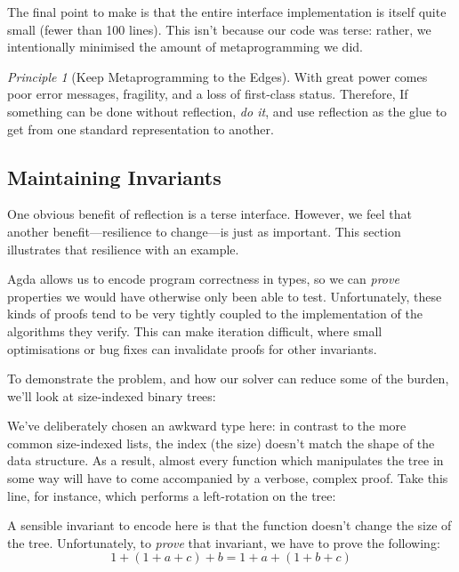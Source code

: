 \documentclass[acmsmall,anonymous]{acmart}\settopmatter{printfolios=true,printccs=false,printacmref=false}
\theoremstyle{remark}
\newtheorem{principle}{Principle}
\begin{document}
The final point to make is that the entire interface implementation is itself
quite small (fewer than 100 lines). This isn't because our code was terse:
rather, we intentionally minimised the amount of metaprogramming we did.

\begin{principle}[Keep Metaprogramming to the Edges] With great power comes poor
  error messages, fragility, and a loss of first-class status. Therefore, If
  something can be done without reflection, \emph{do it}, and use reflection as
  the glue to get from one standard representation to another.
\end{principle}
\subsection{Maintaining Invariants}
One obvious benefit of reflection is a terse interface. However, we feel that
another benefit---resilience to change---is just as important. This section
illustrates that resilience with an example.

Agda allows us to encode program correctness in types, so we can \emph{prove}
properties we would have otherwise only been able to test. Unfortunately, these
kinds of proofs tend to be very tightly coupled to the implementation of the
algorithms they verify. This can make iteration difficult, where small
optimisations or bug fixes can invalidate proofs for other invariants.

To demonstrate the problem, and how our solver can reduce some of the burden,
we'll look at size-indexed binary trees:
\begin{center}
\end{center}

We've deliberately chosen an awkward type here: in contrast to the more common
size-indexed lists, the index (the size) doesn't match the shape of the data
structure. As a result, almost every function which manipulates the tree in some
way will have to come accompanied by a verbose, complex proof. Take this line,
for instance, which performs a left-rotation on the tree:
\begin{center}
\end{center}

A sensible invariant to encode here is that the function doesn't change the size
of the tree. Unfortunately, to \emph{prove} that invariant, we have to prove the
following:
\[1 + (1 + a + c) + b = 1 + a + (1 + b + c)\]
\end{document}
